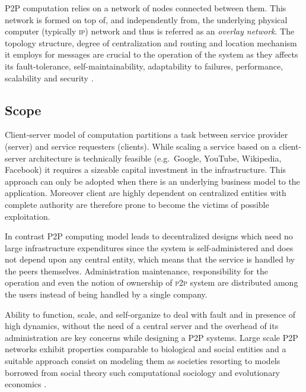 P2P computation relies on a network of nodes connected between them. This network is formed on top of, and independently from, the underlying physical computer (typically \textsc{ip}) network and thus is referred as an \textit{overlay network}. The topology structure, degree of centralization and routing and location mechanism it employs for messages are crucial to the operation of the system as they affects its fault-tolerance, self-maintainability, adaptability to failures, performance, scalability and security \cite{ATS04}.

\subsection{Scope}
Client-server model of computation partitions a task between service provider (server) and service requesters (clients). While scaling a service based on a client-server architecture is technically feasible (e.g.\ Google, YouTube, Wikipedia, Facebook) it requires a sizeable capital investment in the infrastructure. This approach can only be adopted when there is an underlying business model to the application. Moreover client are highly dependent on centralized entities with complete authority are therefore prone to become the victims of possible exploitation.

In contrast P2P computing model leads to decentralized designs which need no large infrastructure expenditures since the system is self-administered and does not depend upon any central entity, which means that the service is handled by the peers themselves. Administration maintenance, responsibility for the operation and even the notion of ownership of \textsc{p2p} system are distributed among the users instead of being handled by a single company.

Ability to function, scale, and self-organize to deal with fault and in presence of high dynamics, without the need of a central server and the overhead of its administration are key concerns while designing a P2P systems. Large scale P2P networks exhibit properties comparable to biological and social entities and a suitable approach consist on modeling them as societies resorting to models borrowed from social theory such computational sociology and evolutionary economics \cite{MH08}.

